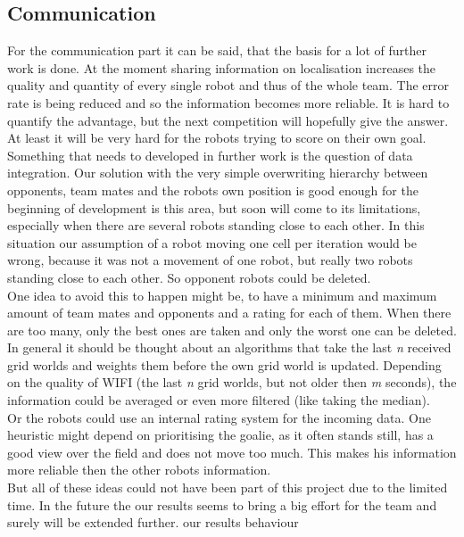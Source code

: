 \documentclass[lnicst,a4paper]{svmultln}
\begin{document}
\subsection{Communication}
For the communication part it can be said, that the basis for a lot of further work is done. At the moment sharing information on localisation increases the quality and quantity of every single robot and thus of the whole team. The error rate is being reduced and so the information becomes more reliable. It is hard to quantify the advantage, but the next competition will hopefully give the answer. At least it will be very hard for the robots trying to score on their own goal.
\\
Something that needs to developed in further work is the question of data integration. Our solution with the very simple overwriting hierarchy between opponents, team mates and the robots own position is good enough for the beginning of development is this area, but soon will come to its limitations, especially when there are several robots standing close to each other. In this situation our assumption of a robot moving one cell per iteration would be wrong, because it was not a movement of one robot, but really two robots standing close to each other. So opponent robots could be deleted. 
\\
One idea to avoid this to happen might be, to have a minimum and maximum amount of team mates and opponents and a rating for each of them. When there are too many, only the best ones are taken and only the worst one can be deleted.
\\
In general it should be thought about an algorithms that take the last \textit{n} received grid worlds and weights them before the own grid world is updated.  Depending on the quality of WIFI (the last \textit{n} grid worlds, but not older then \textit{m} seconds), the information could be averaged or even more filtered (like taking the median). 
\\
Or the robots could use an internal rating system for the incoming data. One heuristic might depend on prioritising the goalie, as it often stands still, has a good view over the field and does not move too much. This makes his information more reliable then the other robots information. 
\\
But all of these ideas could not have been part of this project due to the limited time. In the future the our results seems to bring a big effort for the team and surely will be extended further.
our results
behaviour
\end{document}
